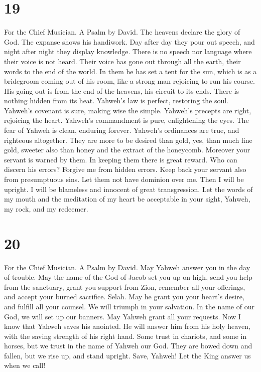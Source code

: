 \hypertarget{section-18}{%
\section{19}\label{section-18}}

For the Chief Musician. A Psalm by David.  The heavens
declare the glory of God. The expanse shows his handiwork. 
Day after day they pour out speech, and night after night they display
knowledge.  There is no speech nor language where their
voice is not heard.  Their voice has gone out through all
the earth, their words to the end of the world. In them he has set a
tent for the sun,  which is as a bridegroom coming out of
his room, like a strong man rejoicing to run his course. 
His going out is from the end of the heavens, his circuit to its ends.
There is nothing hidden from its heat.  Yahweh's law is
perfect, restoring the soul. Yahweh's covenant is sure, making wise the
simple.  Yahweh's precepts are right, rejoicing the heart.
Yahweh's commandment is pure, enlightening the eyes.  The
fear of Yahweh is clean, enduring forever. Yahweh's ordinances are true,
and righteous altogether.  They are more to be desired than
gold, yes, than much fine gold, sweeter also than honey and the extract
of the honeycomb.  Moreover your servant is warned by them.
In keeping them there is great reward.  Who can discern his
errors? Forgive me from hidden errors.  Keep back your
servant also from presumptuous sins. Let them not have dominion over me.
Then I will be upright. I will be blameless and innocent of great
transgression.  Let the words of my mouth and the
meditation of my heart be acceptable in your sight, Yahweh, my rock, and
my redeemer.

\hypertarget{section-19}{%
\section{20}\label{section-19}}

For the Chief Musician. A Psalm by David.  May Yahweh answer
you in the day of trouble. May the name of the God of Jacob set you up
on high,  send you help from the sanctuary, grant you
support from Zion,  remember all your offerings, and accept
your burned sacrifice. Selah.  May he grant you your heart's
desire, and fulfill all your counsel.  We will triumph in
your salvation. In the name of our God, we will set up our banners. May
Yahweh grant all your requests.  Now I know that Yahweh
saves his anointed. He will answer him from his holy heaven, with the
saving strength of his right hand.  Some trust in chariots,
and some in horses, but we trust in the name of Yahweh our God.
 They are bowed down and fallen, but we rise up, and stand
upright.  Save, Yahweh! Let the King answer us when we call!

